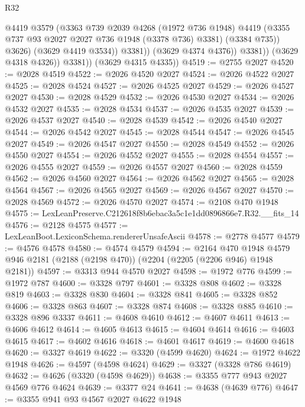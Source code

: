 \begin{lexlean}{R32}
\begin{coremodule}
                          @4419
                          @3579
                          (@3363
                            @739
                            @2039
                            @4268
                            (@1972 @736 @1948)
                            @4419
                            (@3355 @737 @93 @2027 @2027 @736 @1948 (@3378 @736) @3381)
                            (@3384 @735))
                          @3626)
                        (@3629 @4419 @3534))
                      @3381))
                  (@3629 @4374 @4376))
                @3381))
            (@3629 @4318 @4326))
          @3381))
      (@3629 @4315 @4335))
@4519 := @2755 @2027
@4520 := @2028 @4519
@4522 := @2026 @4520 @2027
@4524 := @2026 @4522 @2027
@4525 := @2028 @4524
@4527 := @2026 @4525 @2027
@4529 := @2026 @4527 @2027
@4530 := @2028 @4529
@4532 := @2026 @4530 @2027
@4534 := @2026 @4532 @2027
@4535 := @2028 @4534
@4537 := @2026 @4535 @2027
@4539 := @2026 @4537 @2027
@4540 := @2028 @4539
@4542 := @2026 @4540 @2027
@4544 := @2026 @4542 @2027
@4545 := @2028 @4544
@4547 := @2026 @4545 @2027
@4549 := @2026 @4547 @2027
@4550 := @2028 @4549
@4552 := @2026 @4550 @2027
@4554 := @2026 @4552 @2027
@4555 := @2028 @4554
@4557 := @2026 @4555 @2027
@4559 := @2026 @4557 @2027
@4560 := @2028 @4559
@4562 := @2026 @4560 @2027
@4564 := @2026 @4562 @2027
@4565 := @2028 @4564
@4567 := @2026 @4565 @2027
@4569 := @2026 @4567 @2027
@4570 := @2028 @4569
@4572 := @2026 @4570 @2027
@4574 := @2108 @470 @1948
@4575 := LexLeanPreserve.C212618f8b6ebac3a5c1e1dd0896866e7.R32.__fits_14
@4576 := @2128 @4575
@4577 := LexLeanBoot.LexiconSchema.rendererUnsafeAscii
@4578 := @2778 @4577
@4579 := @4576 @4578
@4580 := @4574 @4579
@4594 := @2164
    @470
    @1948
    @4579
    @946
    @2181
    (@2188 (@2198 @470))
    (@2204 (@2205 (@2206 @946) @1948 @2181))
@4597 := @3313 @944 @4570 @2027
@4598 := @1972 @776
@4599 := @1972 @787
@4600 := @3328 @797
@4601 := @3328 @808
@4602 := @3328 @819
@4603 := @3328 @830
@4604 := @3328 @841
@4605 := @3328 @852
@4606 := @3328 @863
@4607 := @3328 @874
@4608 := @3328 @885
@4610 := @3328 @896 @3337
@4611 := @4608 @4610
@4612 := @4607 @4611
@4613 := @4606 @4612
@4614 := @4605 @4613
@4615 := @4604 @4614
@4616 := @4603 @4615
@4617 := @4602 @4616
@4618 := @4601 @4617
@4619 := @4600 @4618
@4620 := @3327 @4619
@4622 := @3320 (@4599 @4620)
@4624 := @1972 @4622 @1948
@4626 := @4597 (@4598 @4624)
@4629 := @3327 (@3328 @786 @4619)
@4632 := @4626 (@3320 (@4598 @4629))
@4638 := @3355 @777 @943 @2027 @4569 @776 @4624
@4639 := @3377 @24
@4641 := @4638 (@4639 @776)
@4647 := @3355 @941 @93 @4567 @2027 @4622 @1948

\end{coremodule}
\end{lexlean}
